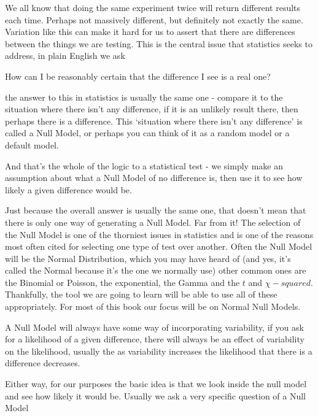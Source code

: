 \documentclass[
]{book}
\newenvironment{myquote}
{\begin{large}
\begin{itshape}
\begin{minipage}{6cm}
}
{
\begin{vspace}{15mm}
\end{vspace}
\end{minipage}
\end{itshape}
\end{large} 
}
\newenvironment{sidenote}
{ \begin{tcolorbox}[colbacktitle=blue!50!white,
title=huh?,coltitle=white,
fonttitle=\bfseries] }
{  \end{tcolorbox} }
\begin{document}
We all know that doing the same experiment twice will return different results each time. Perhaps not massively different, but definitely not exactly the same. Variation like this can make it hard for us to assert that there are differences between the things we are testing. This is the central issue that statistics seeks to address, in plain English we ask

\begin{myquote}
How can I be reasonably certain that the difference I see is a real one?
\end{myquote}

the answer to this in statistics is usually the same one - compare it to the situation where there isn't any difference, if it is an unlikely result there, then perhaps there is a difference. This `situation where there isn't any difference' is called a Null Model, or perhaps you can think of it as a random model or a default model.

And that's the whole of the logic to a statistical test - we simply make an assumption about what a Null Model of no difference is, then use it to see how likely a given difference would be.

\begin{sidenote}
Just because the overall answer is usually the same one, that doesn't mean that there is only one way of generating a Null Model. Far from it! The selection of the Null Model is one of the thorniest issues in statistics and is one of the reasons most often cited for selecting one type of test over another. Often the Null Model will be the Normal Distribution, which you may have heard of (and yes, it's called the Normal because it's the one we normally use) other common ones are the Binomial or Poisson, the exponential, the Gamma and the \(t\) and \(\chi-squared\). Thankfully, the tool we are going to learn will be able to use all of these appropriately. For most of this book our focus will be on Normal Null Models.
\end{sidenote}

A Null Model will always have some way of incorporating variability, if you ask for a likelihood of a given difference, there will always be an effect of variability on the likelihood, usually the as variability increases the likelihood that there is a difference decreases.

Either way, for our purposes the basic idea is that we look inside the null model and see how likely it would be. Usually we ask a very specific question of a Null Model
\end{document}
